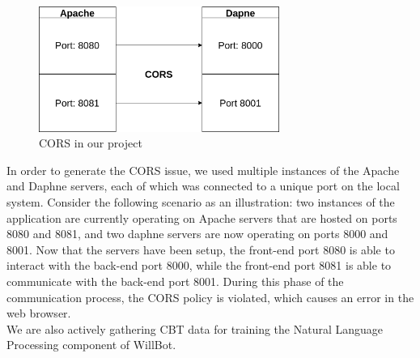 \begin{figure}[h!]
    \centering
    \includegraphics[width=0.7\textwidth,keepaspectratio]{images/workflow-treadwill-Page-2.drawio.png}
    \caption*{CORS in our project}
\end{figure}

\normalsize{
In order to generate the CORS issue, we used multiple instances of the Apache and Daphne servers, each of which was connected to a unique port on the local system.
Consider the following scenario as an illustration: two instances of the application are currently operating on Apache servers that are hosted on ports 8080 and 8081, and two daphne servers are now operating on ports 8000 and 8001. Now that the servers have been setup, the front-end port 8080 is able to interact with the back-end port 8000, while the front-end port 8081 is able to communicate with the back-end port 8001. During this phase of the communication process, the CORS policy is violated, which causes an error in the web browser.\\

We are also actively gathering CBT data for training the Natural Language Processing component of WillBot.
}